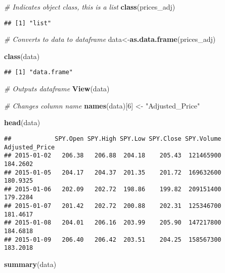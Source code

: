 \documentclass[
]{article}
\newenvironment{Shaded}{\begin{snugshade}}{\end{snugshade}}
\newcommand{\CommentTok}[1]{\textcolor[rgb]{0.56,0.35,0.01}{\textit{#1}}}
\newcommand{\DecValTok}[1]{\textcolor[rgb]{0.00,0.00,0.81}{#1}}
\newcommand{\KeywordTok}[1]{\textcolor[rgb]{0.13,0.29,0.53}{\textbf{#1}}}
\newcommand{\NormalTok}[1]{#1}
\newcommand{\StringTok}[1]{\textcolor[rgb]{0.31,0.60,0.02}{#1}}
\begin{document}
\begin{Shaded}
\begin{Highlighting}[]
  \CommentTok{# Indicates object class, this is a list  }
    \KeywordTok{class}\NormalTok{(prices_adj)}
\end{Highlighting}
\end{Shaded}

\begin{verbatim}
## [1] "list"
\end{verbatim}

\begin{Shaded}
\begin{Highlighting}[]
  \CommentTok{# Converts to data to dataframe  }
\NormalTok{    data<-}\KeywordTok{as.data.frame}\NormalTok{(prices_adj)}
    
    \KeywordTok{class}\NormalTok{(data)}
\end{Highlighting}
\end{Shaded}

\begin{verbatim}
## [1] "data.frame"
\end{verbatim}

\begin{Shaded}
\begin{Highlighting}[]
  \CommentTok{# Outputs dataframe  }
    \KeywordTok{View}\NormalTok{(data)}
    
  \CommentTok{# Changes column name  }
    \KeywordTok{names}\NormalTok{(data)[}\DecValTok{6}\NormalTok{] <-}\StringTok{ "Adjusted_Price"}
    
    \KeywordTok{head}\NormalTok{(data)}
\end{Highlighting}
\end{Shaded}

\begin{verbatim}
##            SPY.Open SPY.High SPY.Low SPY.Close SPY.Volume Adjusted_Price
## 2015-01-02   206.38   206.88  204.18    205.43  121465900       184.2602
## 2015-01-05   204.17   204.37  201.35    201.72  169632600       180.9325
## 2015-01-06   202.09   202.72  198.86    199.82  209151400       179.2284
## 2015-01-07   201.42   202.72  200.88    202.31  125346700       181.4617
## 2015-01-08   204.01   206.16  203.99    205.90  147217800       184.6818
## 2015-01-09   206.40   206.42  203.51    204.25  158567300       183.2018
\end{verbatim}

\begin{Shaded}
\begin{Highlighting}[]
    \KeywordTok{summary}\NormalTok{(data)}
\end{Highlighting}
\end{Shaded}
\end{document}
